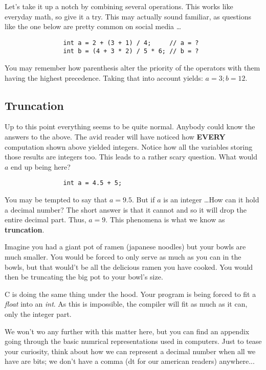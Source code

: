 \documentclass[12pt]{book}
\begin{document}
            Let's take it up a notch by combining several operations. This works like everyday math, so give it a try. This may actually sound familiar, as questions like the one below are pretty common on social media \dots

            \begin{verbatim}
                int a = 2 + (3 + 1) / 4;     // a = ?
                int b = (4 + 3 * 2) / 5 * 6; // b = ?
            \end{verbatim}

            You may remember how parenthesis alter the priority of the operators with them having the highest precedence. Taking that into account yields: $a = 3; b = 12$.

            \subsection{Truncation}

            Up to this point everything seems to be quite normal. Anybody could know the answers to the above. The avid reader will have noticed how \textbf{EVERY} computation shown above yielded integers. Notice how all the variables storing those results are integers too. This leads to a rather scary question. What would $a$ end up being here?

            \begin{verbatim}
                int a = 4.5 + 5;
            \end{verbatim}

            You may be tempted to say that $a = 9.5$. But if $a$ is an integer \dots How can it hold a decimal number? The short answer is that it cannot and so it will drop the entire decimal part. Thus, $a = 9$. This phenomena is what we know as \textbf{truncation}.

            Imagine you had a giant pot of ramen (japanese noodles) but your bowls are much smaller. You would be forced to only serve as much as you can in the bowls, but that would't be all the delicious ramen you have cooked. You would then be truncating the big pot to your bowl's size.

            C is doing the same thing under the hood. Your program is being forced to fit a \textit{float} into an \textit{int}. As this is impossible, the compiler will fit as much as it can, only the integer part.

            We won't wo any further with this matter here, but you can find an appendix going through the basic numrical representations used in computers. Just to tease your curiosity, think about how we can represent a decimal number when all we have are bits; we don't have a comma (dt for our american readers) anywhere...
\end{document}
